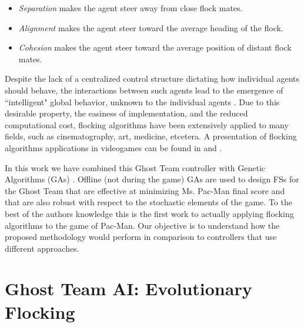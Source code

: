 \documentclass[a4paper]{llncs}
\begin{document}
\begin{itemize}
	\item \textit{Separation} makes the agent steer away from close flock mates.
	\item \textit{Alignment} makes the agent steer toward the average heading of the flock.
	\item \textit{Cohesion} makes the agent steer toward the average position of distant flock mates.
\end{itemize} 

Despite the lack of a centralized control structure dictating how individual agents should behave, the interactions between such agents lead to the emergence of ``intelligent" global behavior, unknown to the individual agents \cite{SpectorEtAl03}. Due to this desirable property, the easiness of implementation, and the reduced computational cost, flocking algorithms have been extensively applied to many fields, such as cinematography, art, medicine, etcetera. A presentation of flocking algorithms applications in videogames can be found in \cite{Scutt02} and \cite{Rabin10}.
 
In this work we have combined this Ghost Team controller with Genetic Algorithms (GAs) \cite{GAs_Goldberg89}. Offline (not during the game) GAs are used to design FSs for the Ghost Team that are effective at minimizing Ms. Pac-Man final score and that are also robust with respect to the stochastic elements of the game. To the best of the authors knowledge this is the first work to actually applying flocking algorithms to the game of Pac-Man. Our objective is to understand how the proposed methodology would perform in comparison to controllers that use different approaches.

%
%

\section{Ghost Team AI: Evolutionary Flocking}
\label{sec:ghosts_ai}

%
\end{document}
